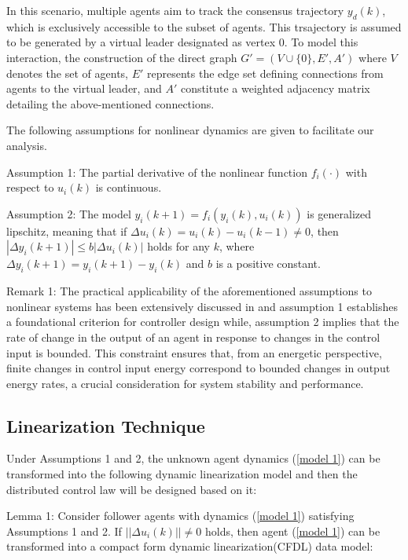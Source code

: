 \documentclass[journal,onecolumn]{IEEEtran}
\begin{document}
In this scenario, multiple agents aim to track the consensus trajectory \(y_d(k)\), which is exclusively accessible to the subset of agents. This trsajectory is assumed to be generated by a virtual leader designated as vertex 0. To model this interaction, the construction of the direct graph \( G' = (V \cup \{0\}, E', A') \) where \( V \) denotes the set of agents, \( E' \) represents the edge set defining connections from agents to the virtual leader, and \( A' \) constitute a weighted adjacency matrix detailing the above-mentioned connections.

The following assumptions for nonlinear dynamics are given to facilitate our analysis.

Assumption 1: The partial derivative of the nonlinear function \( f_i(\cdot) \) with respect to \( u_i(k) \) is continuous.

Assumption 2: The model \( y_i(k + 1) = f_i(y_i(k), u_i(k)) \) is generalized lipschitz, meaning that if \( \Delta u_i(k) = u_i(k) - u_i(k - 1) \neq 0 \), then \( | \Delta y_i(k + 1) | \leq b |\Delta u_i(k)| \) holds for any \( k \), where \( \Delta y_i(k + 1) = y_i(k + 1) - y_i(k) \) and \( b \) is a positive constant.

Remark 1: The practical applicability of the aforementioned assumptions to nonlinear systems has been extensively discussed in \cite{2} and assumption 1 establishes a foundational criterion for controller design while, assumption 2 implies that the rate of change in the output of an agent in response to changes in the control input is bounded. This constraint ensures that, from an energetic perspective, finite changes in control input energy correspond to bounded changes in output energy rates, a crucial consideration for system stability and performance.

\subsection{Linearization Technique}

Under Assumptions 1 and 2, the unknown agent dynamics (\ref{model 1}) can be transformed into the following dynamic linearization model and then the distributed control law will be designed based on it:

Lemma 1: Consider follower agents with dynamics (\ref{model 1}) satisfying Assumptions 1 and 2. If $ ||\Delta u_i(k) || \neq 0 $ holds, then agent (\ref{model 1}) can be transformed into a compact form dynamic linearization(CFDL) data model:
\end{document}
